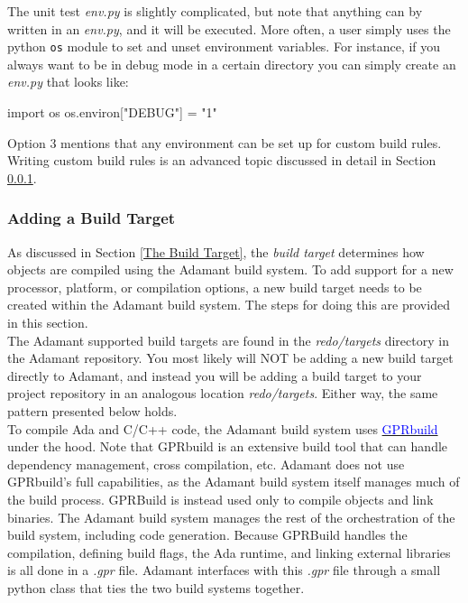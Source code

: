 The unit test \textit{env.py} is slightly complicated, but note that anything can by written in an \textit{env.py}, and it will be executed. More often, a user simply uses the python \texttt{os} module to set and unset environment variables. For instance, if you always want to be in debug mode in a certain directory you can simply create an \textit{env.py} that looks like:

\begin{pythoncode}
import os
os.environ["DEBUG"] = "1"
\end{pythoncode}

Option 3 mentions that any environment can be set up for custom build rules.  Writing custom build rules is an advanced topic discussed in detail in Section \ref{Adding a Build Target}.

\subsubsection{Adding a Build Target} \label{Adding a Build Target}

As discussed in Section \ref{The Build Target}, the \textit{build target} determines how objects are compiled using the Adamant build system. To add support for a new processor, platform, or compilation options, a new build target needs to be created within the Adamant build system. The steps for doing this are provided in this section. \\

The Adamant supported build targets are found in the \textit{redo/targets} directory in the Adamant repository. You most likely will NOT be adding a new build target directly to Adamant, and instead you will be adding a build target to your project repository in an analogous location \textit{redo/targets}. Either way, the same pattern presented below holds. \\

To compile Ada and C/C++ code, the Adamant build system uses \href{https://docs.adacore.com/gprbuild-docs/html/gprbuild_ug.html}{\textcolor{blue}{GPRbuild}} under the hood. Note that GPRbuild is an extensive build tool that can handle dependency management, cross compilation, etc. Adamant does not use GPRbuild's full capabilities, as the Adamant build system itself manages much of the build process. GPRBuild is instead used only to compile objects and link binaries. The Adamant build system manages the rest of the orchestration of the build system, including code generation. Because GPRBuild handles the compilation, defining build flags, the Ada runtime, and linking external libraries is all done in a \textit{.gpr} file. Adamant interfaces with this \textit{.gpr} file through a small python class that ties the two build systems together. \\


